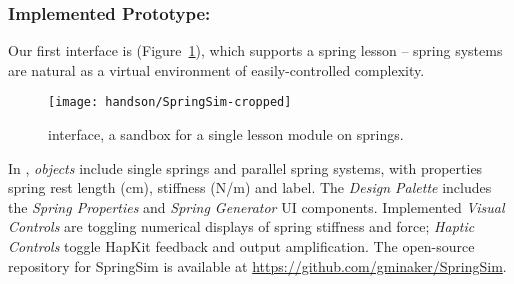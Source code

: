 
\subsubsection{Implemented Prototype: }
Our first \HandsOn interface is \SpringSim
(Figure~\ref{fig:springsim}),
which supports  a spring lesson -- spring systems are natural as a virtual environment of
 easily-controlled complexity. 
%
%
%
%
%
\begin{figure} [bt]
   \centering
   \texttt{[image: handson/SpringSim-cropped]}
   \caption{\SpringSim interface, a \HandsOn sandbox for a single lesson module on springs.}
   \label{fig:springsim}
\end{figure}
In \SpringSim, \emph{objects} include single springs and parallel spring systems, with properties
spring rest length (cm), stiffness (N/m) and label.
The \emph{Design Palette} includes the \textit{Spring Properties} and \textit{Spring Generator} UI components.
Implemented \emph{Visual Controls} are toggling numerical displays of spring stiffness and force; \emph{Haptic Controls}  toggle HapKit feedback and output amplification. The open-source repository for SpringSim is available at \url{https://github.com/gminaker/SpringSim}.
%





